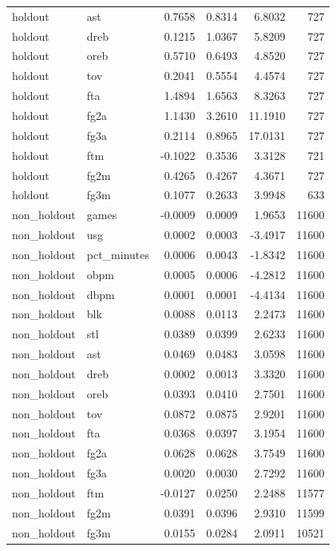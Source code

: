 \begin{table}
\begin{tabular}{llrrrr}
holdout & ast & 0.7658 & 0.8314 & 6.8032 & 727 \\
holdout & dreb & 0.1215 & 1.0367 & 5.8209 & 727 \\
holdout & oreb & 0.5710 & 0.6493 & 4.8520 & 727 \\
holdout & tov & 0.2041 & 0.5554 & 4.4574 & 727 \\
holdout & fta & 1.4894 & 1.6563 & 8.3263 & 727 \\
holdout & fg2a & 1.1430 & 3.2610 & 11.1910 & 727 \\
holdout & fg3a & 0.2114 & 0.8965 & 17.0131 & 727 \\
holdout & ftm & -0.1022 & 0.3536 & 3.3128 & 721 \\
holdout & fg2m & 0.4265 & 0.4267 & 4.3671 & 727 \\
holdout & fg3m & 0.1077 & 0.2633 & 3.9948 & 633 \\
non\_holdout & games & -0.0009 & 0.0009 & 1.9653 & 11600 \\
non\_holdout & usg & 0.0002 & 0.0003 & -3.4917 & 11600 \\
non\_holdout & pct\_minutes & 0.0006 & 0.0043 & -1.8342 & 11600 \\
non\_holdout & obpm & 0.0005 & 0.0006 & -4.2812 & 11600 \\
non\_holdout & dbpm & 0.0001 & 0.0001 & -4.4134 & 11600 \\
non\_holdout & blk & 0.0088 & 0.0113 & 2.2473 & 11600 \\
non\_holdout & stl & 0.0389 & 0.0399 & 2.6233 & 11600 \\
non\_holdout & ast & 0.0469 & 0.0483 & 3.0598 & 11600 \\
non\_holdout & dreb & 0.0002 & 0.0013 & 3.3320 & 11600 \\
non\_holdout & oreb & 0.0393 & 0.0410 & 2.7501 & 11600 \\
non\_holdout & tov & 0.0872 & 0.0875 & 2.9201 & 11600 \\
non\_holdout & fta & 0.0368 & 0.0397 & 3.1954 & 11600 \\
non\_holdout & fg2a & 0.0628 & 0.0628 & 3.7549 & 11600 \\
non\_holdout & fg3a & 0.0020 & 0.0030 & 2.7292 & 11600 \\
non\_holdout & ftm & -0.0127 & 0.0250 & 2.2488 & 11577 \\
non\_holdout & fg2m & 0.0391 & 0.0396 & 2.9310 & 11599 \\
non\_holdout & fg3m & 0.0155 & 0.0284 & 2.0911 & 10521 \\
\bottomrule
\end{tabular}
\end{table}

